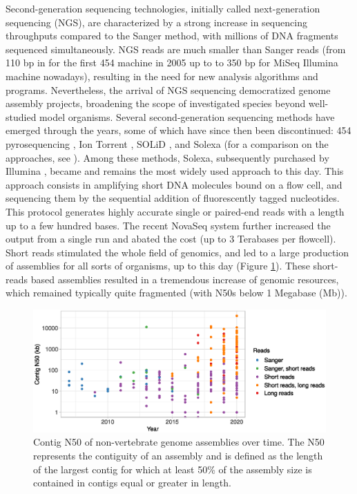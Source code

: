 Second-generation sequencing technologies, initially called next-generation sequencing (NGS), are characterized by a strong increase in sequencing throughputs compared to the Sanger method, with millions of DNA fragments sequenced simultaneously. NGS reads are much smaller than Sanger reads (from 110 bp in for the first 454 machine in 2005 up to to 350 bp for MiSeq Illumina machine nowadays), resulting in the need for new analysis algorithms and programs\cite{pop2008}. Nevertheless, the arrival of NGS sequencing democratized genome assembly projects, broadening the scope of investigated species beyond well-studied model organisms. Several second-generation sequencing methods have emerged through the years, some of which have since then been discontinued: 454 pyrosequencing \cite{pyrosequencing}, Ion Torrent \cite{iontorrent}, SOLiD \cite{solid}, and Solexa (for a comparison on the approaches, see \cite{metzker2010}). Among these methods, Solexa, subsequently purchased by Illumina \cite{illumina}, became and remains the most widely used approach to this day. This approach consists in amplifying short DNA molecules bound on a flow cell, and sequencing them by the sequential addition of fluorescently tagged nucleotides. This protocol generates highly accurate single or paired-end reads with a length up to a few hundred bases. The recent NovaSeq system further increased the output from a single run and abated the cost (up to 3 Terabases per flowcell). Short reads stimulated the whole field of genomics, and led to a large production of assemblies for all sorts of organisms, up to this day (Figure \ref{fig:contig_N50_year}). These short-reads based assemblies resulted in a tremendous increase of genomic resources, which remained typically quite fragmented (with N50s below 1 Megabase (Mb)). \\

\begin{figure}[H]
    \centering
    \includegraphics[width=\textwidth]{fig/review_contig_N50_year.eps}
    \caption{Contig N50 of non-vertebrate genome assemblies over time. The N50 represents the contiguity of an assembly and is defined as the length of the largest contig for which at least 50\% of the assembly size is contained in contigs equal or greater in length.}
    \label{fig:contig_N50_year}
\end{figure}

